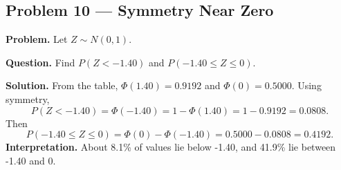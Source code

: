 \begin{ExamProblems}

\item
\subsection*{Problem 10 --- Symmetry Near Zero}

\textbf{Problem.}
Let \(Z\sim N(0,1)\).

\textbf{Question.} Find \(P(Z<-1.40)\) and \(P(-1.40\le Z\le 0)\).

\textbf{Solution.}
From the table, \(\Phi(1.40)=0.9192\) and \(\Phi(0)=0.5000\).
Using symmetry,
\[
P(Z<-1.40)=\Phi(-1.40)=1-\Phi(1.40)=1-0.9192=0.0808.
\]
Then
\[
P(-1.40\le Z\le 0)=\Phi(0)-\Phi(-1.40)=0.5000-0.0808=0.4192.
\]
\textbf{Interpretation.} About 8.1\% of values lie below -1.40, and 41.9\% lie between -1.40 and 0.

\end{ExamProblems}

